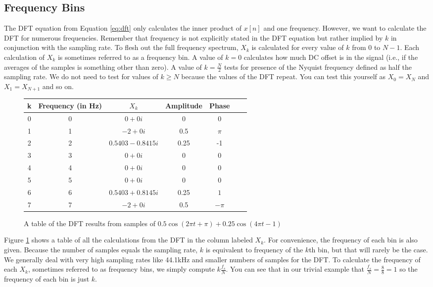 \subsection*{Frequency Bins}

The DFT equation from Equation \ref{eq:dft} only calculates the inner product of $x[n]$ and one
frequency.  However, we want to calculate the DFT for numerous frequencies.  Remember that
frequency is not explicitly stated in the DFT equation but rather implied by $k$ in conjunction with the 
sampling rate.  To flesh out the full frequency spectrum, $X_k$ is calculated for every value of $k$ from 0  to $N - 1$. 
Each calculation of $X_k$ is sometimes referred to as a frequency bin. 
A value of $k = 0$
calculates how much DC offset is in the signal (i.e., if the averages of the samples is something other than zero).
A value of $k = \frac{N}{2}$ tests for presence of the Nyquist frequency defined as half the sampling rate.  We do
not need to test for values of $k \geq N$ because the values of the DFT repeat.
You can test this yourself as $X_0 = X_N$ and $X_1 = X_{N + 1}$ and so on.

\begin{figure}[h] 
	\caption{A table of the DFT results from samples of $0.5\cos(2\pi t + \pi) + 0.25\cos(4\pi t - 1)$}
	\label{fig:dftTable}
	\begin{center}
		\begin{tabular}{ |c|c|c|c|c|c|c| } 
			\hline
			k & Frequency (in Hz) & $X_k$ & Amplitude & Phase \\ 
			\hline
			0 & 0 & $0 + 0i$ & 0 & 0 \\ 
			1 & 1 & $-2 + 0i$ & 0.5 & $\pi$ \\
			2 & 2 & $0.5403 - 0.8415i$ &0.25 & -1 \\
			3 & 3 & $0 + 0i$& 0 & 0 \\
			4 & 4 & $0 + 0i$  & 0 & 0 \\
			5 & 5 & $0 + 0i$  & 0 & 0 \\
			6 & 6 & $0.5403 + 0.8145i$ & 0.25 & $1$ \\
			7 & 7 & $-2 + 0i$  & 0.5 & $-\pi$ \\
			\hline
		\end{tabular}
	\end{center}
	
\end{figure}

Figure \ref{fig:dftTable} shows a table of all the calculations from the DFT in the column labeled $X_k$.  For
convenience, the frequency of each bin is also given.  Because the number of samples equals the sampling rate,
$k$ is equivalent to frequency of the $k$th bin, but that will rarely be the case.  We generally deal with very high
sampling rates like 44.1kHz and smaller numbers of samples for the DFT.  To calculate the frequency of each
$X_k$, sometimes referred to as frequency bins, we simply compute $k\frac{f_s}{N}$.  You can see that in
our trivial example that $\frac{f_s}{N} = \frac{8}{8} = 1$ so the frequency of each bin is just $k$.

